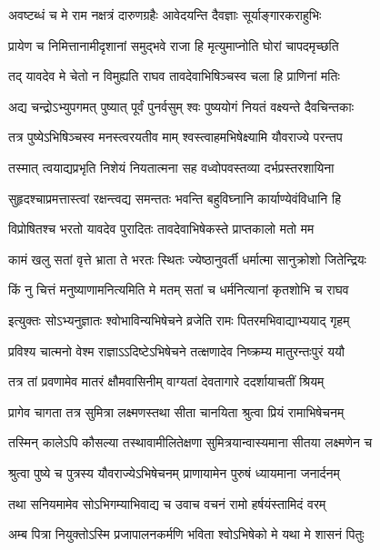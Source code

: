 \twolineshloka
{अवष्टब्धं च मे राम नक्षत्रं दारुणग्रहैः}
{आवेदयन्ति दैवज्ञाः सूर्याङ्गारकराहुभिः} %

\twolineshloka
{प्रायेण च निमित्तानामीदृशानां समुद्भवे}
{राजा हि मृत्युमाप्नोति घोरां चापदमृच्छति} %

\twolineshloka
{तद् यावदेव मे चेतो न विमुह्यति राघव}
{तावदेवाभिषिञ्चस्व चला हि प्राणिनां मतिः} %

\twolineshloka
{अद्य चन्द्रोऽभ्युपगमत् पुष्यात् पूर्वं पुनर्वसुम्}
{श्वः पुष्ययोगं नियतं वक्ष्यन्ते दैवचिन्तकाः} %

\twolineshloka
{तत्र पुष्येऽभिषिञ्चस्व मनस्त्वरयतीव माम्}
{श्वस्त्वाहमभिषेक्ष्यामि यौवराज्ये परन्तप} %

\twolineshloka
{तस्मात् त्वयाद्यप्रभृति निशेयं नियतात्मना}
{सह वध्वोपवस्तव्या दर्भप्रस्तरशायिना} %

\twolineshloka
{सुहृदश्चाप्रमत्तास्त्वां रक्षन्त्वद्य समन्ततः}
{भवन्ति बहुविघ्नानि कार्याण्येवंविधानि हि} %

\twolineshloka
{विप्रोषितश्च भरतो यावदेव पुरादितः}
{तावदेवाभिषेकस्ते प्राप्तकालो मतो मम} %

\twolineshloka
{कामं खलु सतां वृत्ते भ्राता ते भरतः स्थितः}
{ज्येष्ठानुवर्ती धर्मात्मा सानुक्रोशो जितेन्द्रियः} %

\twolineshloka
{किं नु चित्तं मनुष्याणामनित्यमिति मे मतम्}
{सतां च धर्मनित्यानां कृतशोभि च राघव} %

\twolineshloka
{इत्युक्तः सोऽभ्यनुज्ञातः श्वोभाविन्यभिषेचने}
{व्रजेति रामः पितरमभिवाद्याभ्ययाद् गृहम्} %

\twolineshloka
{प्रविश्य चात्मनो वेश्म राज्ञाऽऽदिष्टेऽभिषेचने}
{तत्क्षणादेव निष्क्रम्य मातुरन्तःपुरं ययौ} %

\twolineshloka
{तत्र तां प्रवणामेव मातरं क्षौमवासिनीम्}
{वाग्यतां देवतागारे ददर्शायाचतीं श्रियम्} %

\twolineshloka
{प्रागेव चागता तत्र सुमित्रा लक्ष्मणस्तथा}
{सीता चानयिता श्रुत्वा प्रियं रामाभिषेचनम्} %

\twolineshloka
{तस्मिन् कालेऽपि कौसल्या तस्थावामीलितेक्षणा}
{सुमित्रयान्वास्यमाना सीतया लक्ष्मणेन च} %

\twolineshloka
{श्रुत्वा पुष्ये च पुत्रस्य यौवराज्येऽभिषेचनम्}
{प्राणायामेन पुरुषं ध्यायमाना जनार्दनम्} %

\twolineshloka
{तथा सनियमामेव सोऽभिगम्याभिवाद्य च}
{उवाच वचनं रामो हर्षयंस्तामिदं वरम्} %

\twolineshloka
{अम्ब पित्रा नियुक्तोऽस्मि प्रजापालनकर्मणि}
{भविता श्वोऽभिषेको मे यथा मे शासनं पितुः} %

